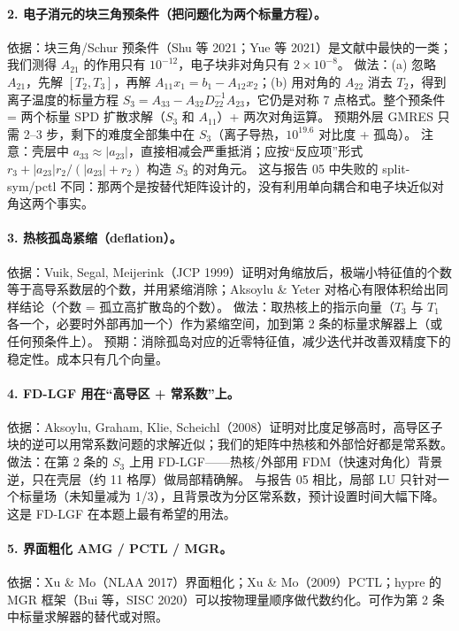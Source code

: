 \documentclass[11pt,a4paper]{ctexart}
\begin{document}
\paragraph{2. 电子消元的块三角预条件（把问题化为两个标量方程）。}
依据：块三角/Schur 预条件（Shu 等 2021；Yue 等 2021）是文献中最快的一类；我们测得 $A_{21}$ 的作用只有 $10^{-12}$，电子块非对角只有 $2\times10^{-8}$。
做法：(a) 忽略 $A_{21}$，先解 $[T_2,T_3]$，再解 $A_{11}x_1=b_1-A_{12}x_2$；(b) 用对角的 $A_{22}$ 消去 $T_2$，得到离子温度的标量方程
$S_3=A_{33}-A_{32}D_{22}^{-1}A_{23}$，它仍是对称 7 点格式。整个预条件 = 两个标量 SPD 扩散求解（$S_3$ 和 $A_{11}$）+ 两次对角运算。
预期外层 GMRES 只需 2--3 步，剩下的难度全部集中在 $S_3$（离子导热，$10^{19.6}$ 对比度 + 孤岛）。
注意：壳层中 $a_{33}\approx|a_{23}|$，直接相减会严重抵消；应按“反应项”形式 $r_3+|a_{23}|r_2/(|a_{23}|+r_2)$ 构造 $S_3$ 的对角元。
这与报告 05 中失败的 split-sym/pctl 不同：那两个是按替代矩阵设计的，没有利用单向耦合和电子块近似对角这两个事实。

\paragraph{3. 热核孤岛紧缩（deflation）。}
依据：Vuik, Segal, Meijerink（JCP 1999）证明对角缩放后，极端小特征值的个数等于高导系数层的个数，并用紧缩消除；Aksoylu \& Yeter 对格心有限体积给出同样结论（个数 = 孤立高扩散岛的个数）。
做法：取热核上的指示向量（$T_3$ 与 $T_1$ 各一个，必要时外部再加一个）作为紧缩空间，加到第 2 条的标量求解器上（或任何预条件上）。
预期：消除孤岛对应的近零特征值，减少迭代并改善双精度下的稳定性。成本只有几个向量。

\paragraph{4. FD-LGF 用在“高导区 + 常系数”上。}
依据：Aksoylu, Graham, Klie, Scheichl（2008）证明对比度足够高时，高导区子块的逆可以用常系数问题的求解近似；我们的矩阵中热核和外部恰好都是常系数。
做法：在第 2 条的 $S_3$ 上用 FD-LGF——热核/外部用 FDM（快速对角化）背景逆，只在壳层（约 11 格厚）做局部精确解。
与报告 05 相比，局部 LU 只针对一个标量场（未知量减为 1/3），且背景改为分区常系数，预计设置时间大幅下降。这是 FD-LGF 在本题上最有希望的用法。

\paragraph{5. 界面粗化 AMG / PCTL / MGR。}
依据：Xu \& Mo（NLAA 2017）界面粗化；Xu \& Mo（2009）PCTL；hypre 的 MGR 框架（Bui 等，SISC 2020）可以按物理量顺序做代数约化。可作为第 2 条中标量求解器的替代或对照。
\end{document}
